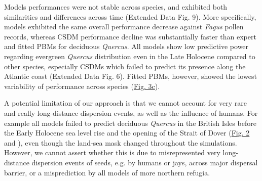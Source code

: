 \documentclass[pdflatex, sn-nature]{sn-jnl}%
\begin{document}
Models performances were not stable across species, and exhibited both similarities and differences across time (Extended Data Fig. 9). More specifically, models exhibited the same overall performance decrease against \emph{Fagus} pollen records, whereas CSDM performance decline was substantially faster than expert and fitted PBMs for deciduous \emph{Quercus}. All models show low predictive power regarding evergreen \emph{Quercus} distribution even in the Late Holocene compared to other species, especially CSDMs which failed to predict its presence along the Atlantic coast (Extended Data Fig. 6). Fitted PBMs, however, showed the lowest variability of performance across species (\hyperref[past_performance]{Fig. 3c}).

A potential limitation of our approach is that we cannot account for very rare and really long-distance dispersion events, as well as the influence of humans. For example all models failed to predict deciduous \emph{Quercus} in the British Isles before the Early Holocene sea level rise and the opening of the Strait of Dover (\hyperref[quercus_migration]{Fig. 2} and \cite{Smith2011}), even though the land-sea mask changed throughout the simulations. However, we cannot assert whether this is due to misrepresented very long-distance dispersion events of seeds, e.g. by humans or jays, across major dispersal barrier, or a misprediction by all models of more northern refugia.
\end{document}
